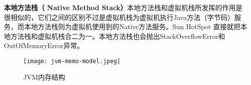\documentclass[../../../interview-questions.tex]{subfiles}
\begin{document}
\textbf{本地方法栈（ Native Method Stack）}本地方法栈和虚拟机栈所发挥的作用是很相似的，它们之间的区别不过是虚拟机栈为虚拟机执行Java方法（字节码）服务，而本地方法栈则为虚拟机使用到的Native方法服务。Sun HotSpot 直接就把本地方法栈和虚拟机栈合二为一。本地方法栈也会抛出StackOverflowError和OutOfMemoryError异常。

\begin{figure}[htbp]
	\centering
	\texttt{[image: jvm-memo-model.jpeg]}
	\caption{JVM内存结构}
	\label{fig:collection1}
\end{figure}
\end{document}
